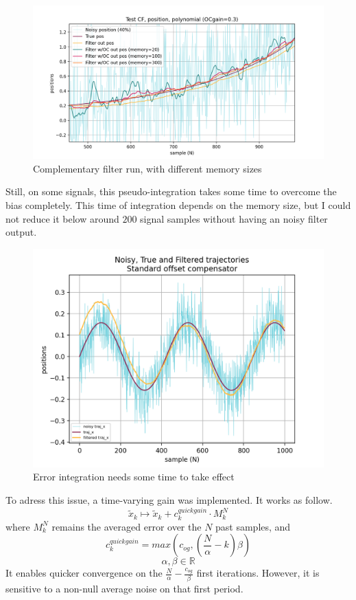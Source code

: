 \documentclass[a4paper,10pt]{article}
\begin{document}
\begin{figure}[H]
\centering
  \includegraphics[width=\linewidth, angle=0, scale=1.1]{./images/TestCF_run14_polynomial.png}
  \caption{Complementary filter run, with different memory sizes}
\end{figure}

Still, on some signals, this pseudo-integration takes some time to overcome the bias completely. This time of integration depends on the memory size, but I could not reduce it below around $200$ signal samples without having an noisy filter output. 

\begin{figure}[H]
\centering
  \includegraphics[width=\linewidth, angle=0, scale=0.8]{./images/CF_test_sinus_1_Standard.png}
  \caption{Error integration needs some time to take effect}
\end{figure}


To adress this issue, a time-varying gain was implemented. It works as follow.
$$\widetilde{x}_k \mapsto \widetilde{x}_k + c_k^{quickgain} \cdot M_k^N$$
where $M_k^N$ remains the averaged error over the $N$ past samples, and
$$c_k^{quickgain} = max( c_{og} , (\frac{N}{\alpha} - k)\beta) $$
$$\alpha, \beta \in\mathbb{R}$$
It enables quicker convergence on the $\frac{N}{\alpha} - \frac{c_{og}}{\beta}$ first iterations. However, it is sensitive to a non-null average noise on that first period.
\end{document}

